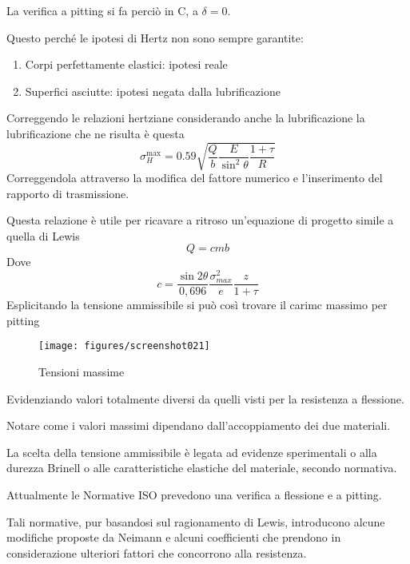 \documentclass[a4paper, 15pt]{article}
\begin{document}
\begin{adjustwidth}{2in}{}
	La verifica a pitting si fa perciò in C, a $\delta=0$. 
	
	Questo perché le ipotesi di Hertz non sono sempre garantite:
	\begin{enumerate}
		\item Corpi perfettamente elastici: ipotesi reale
		\item Superfici asciutte: ipotesi negata dalla lubrificazione
	\end{enumerate}
	Correggendo le relazioni hertziane considerando anche la lubrificazione la lubrificazione che ne risulta è questa 
	\[\sigma_H^{\max} = 0.59\sqrt{\dfrac{Q}{b}\dfrac{E}{\sin^2\theta}\dfrac{1+\tau}{R}}\]
	Correggendola attraverso la modifica del fattore numerico e l'inserimento del rapporto di trasmissione. 
	
	Questa relazione è utile per ricavare a ritroso un'equazione di progetto simile a quella di Lewis
	\[Q = cmb \]
	Dove
	\[c = \dfrac{\sin2\theta}{0,696}\dfrac{\sigma_{max}^2}{e}\dfrac{z}{1+\tau}\]
	Esplicitando la tensione ammissibile si può così trovare il carimc massimo per pitting 
	\begin{figure}[H]
		\centering
		\texttt{[image: figures/screenshot021]}
		\caption{Tensioni massime}
		\label{fig:screenshot021}
	\end{figure}
	Evidenziando valori totalmente diversi da quelli visti per la resistenza a flessione. 
	
	Notare come i valori massimi dipendano dall'accoppiamento dei due materiali. \newline 
	
	La scelta della tensione ammissibile è legata ad evidenze sperimentali o alla durezza Brinell o alle caratteristiche elastiche del materiale, secondo normativa. 
	
	Attualmente le Normative ISO prevedono una verifica a flessione e a pitting. 
	
	Tali normative, pur basandosi sul ragionamento di Lewis, introducono alcune modifiche proposte da Neimann e alcuni coefficienti che prendono in considerazione ulteriori fattori che concorrono alla resistenza. 
\end{adjustwidth}
\newpage
\end{document}
